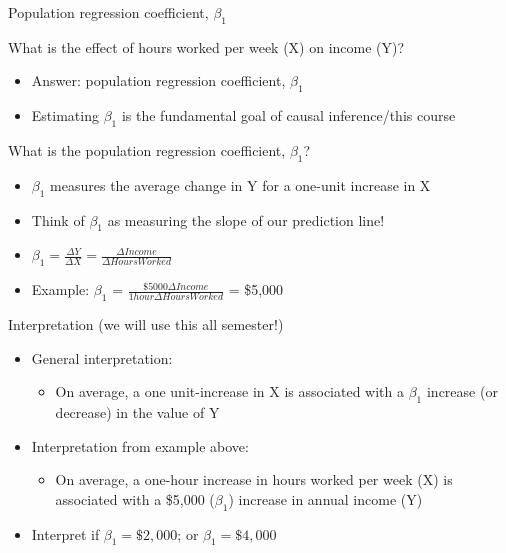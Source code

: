 \documentclass[
  8pt,
  ignorenonframetext,
  dvipsnames]{beamer}
\providecommand{\tightlist}{%
  \setlength{\itemsep}{0pt}\setlength{\parskip}{0pt}}
\let\olditem\item
\renewcommand{\item}{%
  \olditem\vspace{4pt}
}
\begin{document}
\begin{frame}{Population regression coefficient, \(\beta_1\)}
\protect\hypertarget{population-regression-coefficient-beta_1}{}

What is the effect of hours worked per week (X) on income (Y)?

\begin{itemize}
\tightlist
\item
  Answer: population regression coefficient, \(\beta_1\)
\item
  Estimating \(\beta_1\) is the fundamental goal of causal
  inference/this course
\end{itemize}

\medskip

What is the population regression coefficient, \(\beta_1\)?

\begin{itemize}
\item
  \(\beta_1\) measures the average change in Y for a one-unit increase
  in X
\item
  Think of \(\beta_1\) as measuring the slope of our prediction line!
\item
  \(\beta_1 = \frac{\Delta Y}{\Delta X} = \frac{\Delta Income}{\Delta Hours Worked}\)
\item
  Example: \(\beta_1\) =
  \(\frac{\$5000 \Delta Income}{1hour \Delta HoursWorked}\) = \$5,000
\end{itemize}

\medskip

Interpretation (we will use this all semester!)

\begin{itemize}
\tightlist
\item
  General interpretation:

  \begin{itemize}
  \tightlist
  \item
    On average, a one unit-increase in X is associated with a
    \(\beta_1\) increase (or decrease) in the value of Y
  \end{itemize}
\item
  Interpretation from example above:

  \begin{itemize}
  \tightlist
  \item
    On average, a one-hour increase in hours worked per week (X) is
    associated with a \$5,000 (\(\beta_1\)) increase in annual income
    (Y)
  \end{itemize}
\item
  Interpret if \(\beta_1 = \$2,000\); or \(\beta_1 = \$4,000\)
\end{itemize}

\end{frame}
\end{document}
